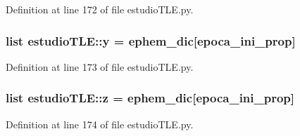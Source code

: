 \-Definition at line 172 of file estudio\-T\-L\-E.\-py.

\subsubsection[{y}]{\setlength{\rightskip}{0pt plus 5cm}list {\bf estudio\-T\-L\-E\-::y} = {\bf ephem\-\_\-dic}[{\bf epoca\-\_\-ini\-\_\-prop}]}\label{namespaceestudio_t_l_e_af75e112c996e585da463ace7e180a471}


\-Definition at line 173 of file estudio\-T\-L\-E.\-py.

\subsubsection[{z}]{\setlength{\rightskip}{0pt plus 5cm}list {\bf estudio\-T\-L\-E\-::z} = {\bf ephem\-\_\-dic}[{\bf epoca\-\_\-ini\-\_\-prop}]}\label{namespaceestudio_t_l_e_a3ec34a740b736765542eaf20999a4b7a}


\-Definition at line 174 of file estudio\-T\-L\-E.\-py.

